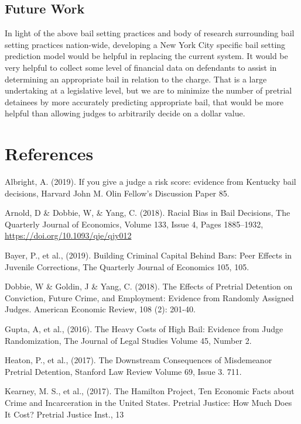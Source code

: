 \documentclass[
  english,
  man]{apa6}
\begin{document}
\hypertarget{future-work}{%
\subsection{Future Work}\label{future-work}}

In light of the above bail setting practices and body of research surrounding bail setting practices nation-wide, developing a New York City specific bail setting prediction model would be helpful in replacing the current system. It would be very helpful to collect some level of financial data on defendants to assist in determining an appropriate bail in relation to the charge. That is a large undertaking at a legislative level, but we are to minimize the number of pretrial detainees by more accurately predicting appropriate bail, that would be more helpful than allowing judges to arbitrarily decide on a dollar value.

\newpage

\hypertarget{references}{%
\section{References}\label{references}}

\begingroup
\setlength{\parindent}{-0.5in}
\setlength{\leftskip}{0.5in}

Albright, A. (2019). If you give a judge a risk score: evidence from Kentucky bail decisions, Harvard John M. Olin Fellow's Discussion Paper 85.

Arnold, D \& Dobbie, W, \& Yang, C. (2018). Racial Bias in Bail Decisions,
The Quarterly Journal of Economics, Volume 133, Issue 4, Pages 1885--1932,
\url{https://doi.org/10.1093/qje/qjy012}

Bayer, P., et al., (2019). Building Criminal Capital Behind Bars: Peer Effects in Juvenile Corrections,
The Quarterly Journal of Economics 105, 105.

Dobbie, W \& Goldin, J \& Yang, C. (2018). The Effects of Pretrial Detention on Conviction, Future Crime, and Employment: Evidence from Randomly Assigned Judges. American Economic Review, 108 (2): 201-40.

Gupta, A, et al., (2016). The Heavy Costs of High Bail: Evidence from Judge Randomization,
The Journal of Legal Studies Volume 45, Number 2.

Heaton, P., et al., (2017). The Downstream Consequences of Misdemeanor Pretrial Detention,
Stanford Law Review Volume 69, Issue 3. 711.

Kearney, M. S., et al., (2017). The Hamilton Project, Ten Economic Facts about Crime and
Incarceration in the United States. Pretrial Justice: How Much Does It Cost? Pretrial Justice Inst., 13
\end{document}

